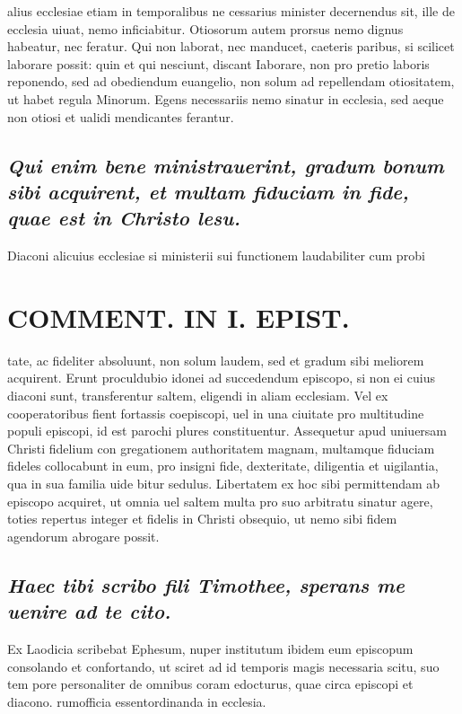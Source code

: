 \documentclass{article}
\begin{document}
\begin{pages}
alius ecclesiae etiam in temporalibus ne cessarius minister decernendus sit, ille de ecclesia uiuat, nemo inficiabitur. Otiosorum autem prorsus nemo dignus habeatur, nec feratur. Qui non laborat, nec manducet, caeteris paribus, si scilicet laborare possit: quin et qui nesciunt, discant Iaborare, non pro pretio laboris reponendo, sed ad obediendum euangelio, non solum ad repellendam otiositatem, ut habet regula Minorum. Egens necessariis nemo sinatur in ecclesia, sed aeque non otiosi et ualidi mendicantes ferantur.  \pend
{}
{}
\subsection*{\textit{Qui enim bene ministrauerint, gradum bonum sibi acquirent, et multam fiduciam in fide, quae est in Christo lesu. }}\pstart Diaconi alicuius ecclesiae si ministerii sui functionem laudabiliter cum probi  \pend
\section*{COMMENT. IN I. EPIST. }
\marginpar{[ p.502 ]}\pstart tate, ac fideliter absoluunt, non solum laudem, sed et gradum sibi meliorem acquirent. Erunt proculdubio idonei ad succedendum episcopo, si non ei cuius diaconi sunt, transferentur saltem, eligendi in aliam ecclesiam. Vel ex cooperatoribus fient fortassis coepiscopi, uel in una ciuitate pro multitudine populi episcopi, id est parochi plures constituentur. Assequetur apud uniuersam Christi fidelium con gregationem authoritatem magnam, multamque fiduciam fideles collocabunt in eum, pro insigni fide, dexteritate, diligentia et uigilantia, qua in sua familia uide bitur sedulus. Libertatem ex hoc sibi permittendam ab episcopo acquiret, ut omnia uel saltem multa pro suo arbitratu sinatur agere, toties repertus integer et fidelis in Christi obsequio, ut nemo sibi fidem agendorum abrogare possit.  \pend
{}
{}
\subsection*{\textit{Haec tibi scribo fili Timothee, sperans me uenire ad te cito. }}\pstart Ex Laodicia scribebat Ephesum, nuper institutum ibidem eum episcopum consolando et confortando, ut sciret ad id temporis magis necessaria scitu, suo tem pore personaliter de omnibus coram edocturus, quae circa episcopi et diacono. rumofficia essentordinanda in ecclesia.  \pend
{}
{}

\end{pages}
\end{document}

